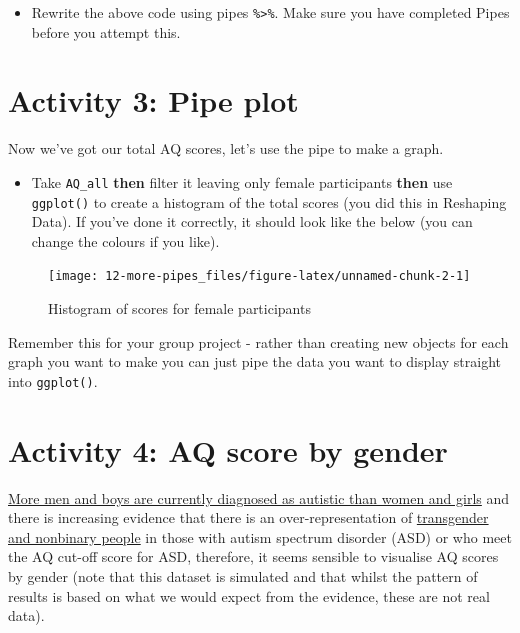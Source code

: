 \documentclass[
  oneside]{book}
\providecommand{\tightlist}{%
  \setlength{\itemsep}{0pt}\setlength{\parskip}{0pt}}
\begin{document}
\begin{itemize}
\tightlist
\item
  Rewrite the above code using pipes \texttt{\%\textgreater{}\%}. Make sure you have completed Pipes before you attempt this.
\end{itemize}

\hypertarget{activity-3-pipe-plot}{%
\section{Activity 3: Pipe plot}\label{activity-3-pipe-plot}}

Now we've got our total AQ scores, let's use the pipe to make a graph.

\begin{itemize}
\tightlist
\item
  Take \texttt{AQ\_all} \textbf{then} filter it leaving only female participants \textbf{then} use \texttt{ggplot()} to create a histogram of the total scores (you did this in Reshaping Data). If you've done it correctly, it should look like the below (you can change the colours if you like).
\end{itemize}

\begin{figure}

{\centering \texttt{[image: 12-more-pipes\_files/figure-latex/unnamed-chunk-2-1]} 

}

\caption{Histogram of scores for female participants}\label{fig:unnamed-chunk-2}
\end{figure}

Remember this for your group project - rather than creating new objects for each graph you want to make you can just pipe the data you want to display straight into \texttt{ggplot()}.

\hypertarget{activity-4-aq-score-by-gender}{%
\section{Activity 4: AQ score by gender}\label{activity-4-aq-score-by-gender}}

\href{https://www.autism.org.uk/about/what-is/gender.aspx}{More men and boys are currently diagnosed as autistic than women and girls} and there is increasing evidence that there is an over-representation of \href{https://www.ncbi.nlm.nih.gov/pubmed/31260907}{transgender and nonbinary people} in those with autism spectrum disorder (ASD) or who meet the AQ cut-off score for ASD, therefore, it seems sensible to visualise AQ scores by gender (note that this dataset is simulated and that whilst the pattern of results is based on what we would expect from the evidence, these are not real data).
\end{document}
